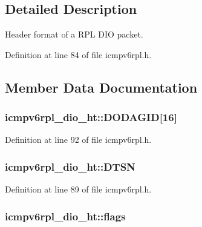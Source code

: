 \subsection{Detailed Description}
Header format of a R\+PL D\+IO packet. 

Definition at line 84 of file icmpv6rpl.\+h.



\subsection{Member Data Documentation}
\subsubsection[{\texorpdfstring{D\+O\+D\+A\+G\+ID}{DODAGID}}]{ icmpv6rpl\+\_\+dio\+\_\+ht\+::\+D\+O\+D\+A\+G\+ID\mbox{[}16\mbox{]}}\hypertarget{structicmpv6rpl__dio__ht_a486b0c1d41a2c3fdc213c88e2e31ee39}{}\label{structicmpv6rpl__dio__ht_a486b0c1d41a2c3fdc213c88e2e31ee39}


Definition at line 92 of file icmpv6rpl.\+h.

\subsubsection[{\texorpdfstring{D\+T\+SN}{DTSN}}]{ icmpv6rpl\+\_\+dio\+\_\+ht\+::\+D\+T\+SN}\hypertarget{structicmpv6rpl__dio__ht_ae51455dabdffd16970fc4c686e61b5a5}{}\label{structicmpv6rpl__dio__ht_ae51455dabdffd16970fc4c686e61b5a5}


Definition at line 89 of file icmpv6rpl.\+h.

\subsubsection[{\texorpdfstring{flags}{flags}}]{ icmpv6rpl\+\_\+dio\+\_\+ht\+::flags}\hypertarget{structicmpv6rpl__dio__ht_ad33b242f22ab4a32610a156978733da8}{}\label{structicmpv6rpl__dio__ht_ad33b242f22ab4a32610a156978733da8}


